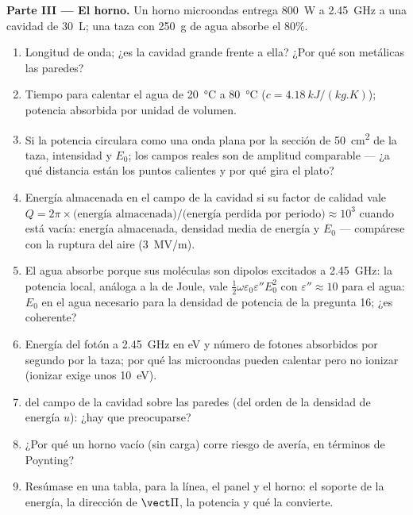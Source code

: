 \begin{problem}
\medskip
\noindent\textbf{Parte III --- El horno.}
Un horno microondas entrega \qty{800}{W} a \qty{2.45}{GHz} a una cavidad de
\qty{30}{L}; una taza con \qty{250}{g} de agua absorbe el $80\%$.
\begin{enumerate}[resume]
  \item Longitud de onda; ¿es la cavidad grande frente a ella? ¿Por qué
        son metálicas las paredes?
  \item Tiempo para calentar el agua de \qty{20}{\degreeCelsius} a \qty{80}{\degreeCelsius}
        ($c = \qty{4.18}{kJ/(kg.K)}$); potencia absorbida por unidad de volumen.
  \item Si la potencia circulara como una onda plana por la sección de
        \qty{50}{cm^2} de la taza, intensidad y $E_0$; los campos reales son
         de amplitud comparable --- ¿a qué distancia
        están los puntos calientes y por qué gira el plato?
  \item Energía almacenada en el campo de la cavidad si su factor de
        calidad vale $Q = 2\pi\times\text{(energía almacenada)}/\text{(energía perdida por periodo)}
        \approx 10^3$ cuando está vacía: energía almacenada, densidad media
        de energía y $E_0$ --- compárese con la ruptura del aire (\qty{3}{MV/m}).
  \item El agua absorbe porque sus moléculas son dipolos excitados a
        \qty{2.45}{GHz}: la potencia local, análoga a la de Joule, vale $\tfrac12\omega\varepsilon_0
        \varepsilon''E_0^2$ con $\varepsilon'' \approx 10$ para el agua: $E_0$ en el agua
        necesario para la densidad de potencia de la pregunta 16; ¿es
        coherente?
  \item Energía del fotón a \qty{2.45}{GHz} en eV y número de fotones
        absorbidos por segundo por la taza; por qué las microondas pueden
        calentar pero no ionizar (ionizar exige unos \qty{10}{eV}).
  \item {} del campo de la cavidad sobre las paredes
        (del orden de la densidad de energía $u$): ¿hay que preocuparse?
  \item ¿Por qué un horno vacío (sin carga) corre riesgo de avería, en
        términos de Poynting?
  \item Resúmase en una tabla, para la línea, el panel y el horno: el
        soporte de la energía, la dirección de $\vect\Pi$, la potencia y qué
        la convierte.
\end{enumerate}
\end{problem}
